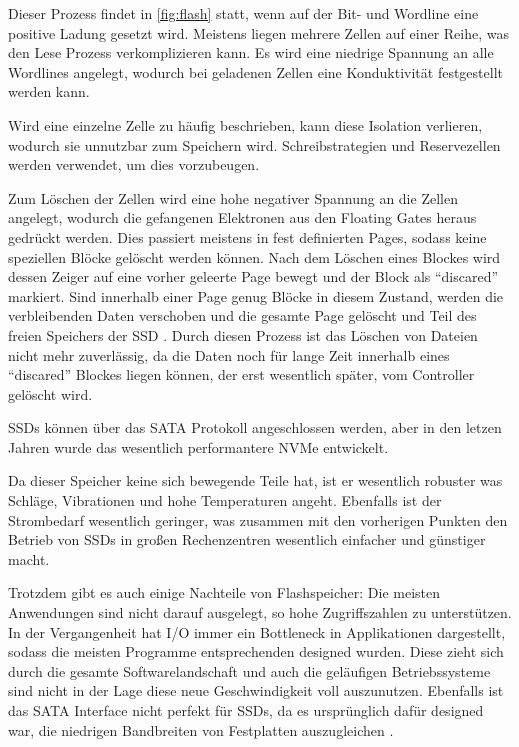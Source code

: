 Dieser Prozess findet in \autoref{fig:flash} statt, wenn auf der Bit- und Wordline eine positive Ladung gesetzt wird. Meistens liegen mehrere Zellen auf einer Reihe, was den Lese Prozess verkomplizieren kann. Es wird eine niedrige Spannung an alle Wordlines angelegt, wodurch bei geladenen Zellen eine Konduktivität festgestellt werden kann. 

Wird eine einzelne Zelle zu häufig beschrieben, kann diese Isolation verlieren, wodurch sie unnutzbar zum Speichern wird. Schreibstrategien und Reservezellen werden verwendet, um dies vorzubeugen.	

Zum Löschen der Zellen wird eine hohe negativer Spannung an die Zellen angelegt, wodurch die gefangenen Elektronen aus den Floating Gates heraus gedrückt werden. Dies passiert meistens in fest definierten Pages, sodass keine speziellen Blöcke gelöscht werden können. Nach dem Löschen eines Blockes wird dessen Zeiger auf eine vorher geleerte Page bewegt und der Block als ``discared'' markiert. Sind innerhalb einer Page genug Blöcke in diesem Zustand, werden die verbleibenden Daten verschoben und die gesamte Page gelöscht und Teil des freien Speichers der SSD \parencite{kaufmann.2016}. 
Durch diesen Prozess ist das Löschen von Dateien nicht mehr zuverlässig, da die Daten noch für lange Zeit innerhalb eines ``discared'' Blockes liegen können, der erst wesentlich später, vom Controller gelöscht wird.

SSDs können über das SATA Protokoll angeschlossen werden, aber in den letzen Jahren wurde das wesentlich performantere NVMe entwickelt.

Da dieser Speicher keine sich bewegende Teile hat, ist er wesentlich robuster was Schläge, Vibrationen und hohe Temperaturen angeht. Ebenfalls ist der Strombedarf wesentlich geringer, was zusammen mit den vorherigen Punkten den Betrieb von SSDs in großen Rechenzentren wesentlich einfacher und günstiger macht.

Trotzdem gibt es auch einige Nachteile von Flashspeicher: Die meisten Anwendungen sind nicht darauf ausgelegt, so hohe Zugriffszahlen zu unterstützen. In der Vergangenheit hat I/O immer ein Bottleneck in Applikationen dargestellt, sodass die meisten Programme entsprechenden designed wurden.
Diese zieht sich durch die gesamte Softwarelandschaft und auch die geläufigen Betriebssysteme sind nicht in der Lage diese neue Geschwindigkeit voll auszunutzen. Ebenfalls ist das SATA Interface nicht perfekt für SSDs, da es ursprünglich dafür designed war, die niedrigen Bandbreiten von Festplatten auszugleichen \parencite[Kap. 3]{kaufmann.2016}.


